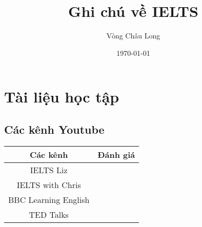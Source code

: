 \documentclass{report}
\title{Ghi chú về IELTS}
\author{Vòng Châu Long}
\date{\today}
\begin{document}
	\maketitle
	
	\chapter{Tài liệu học tập}
	\section{Các kênh Youtube}
	\begin{tabular}{cc}
		\toprule
		Các kênh & Đánh giá \\ 
		\midrule
		IELTS Liz & \\
		\midrule
		IELTS with Chris & \\
		\midrule 
		BBC Learning English & \\
		\midrule
		TED Talks & \\
		\bottomrule
	\end{tabular} 
\end{document}
